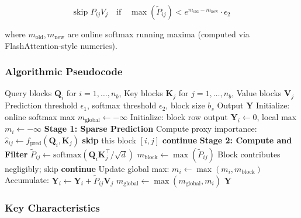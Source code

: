 \documentclass[11pt,a4paper]{article}
\begin{document}
\[
\text{skip } P_{ij} V_j \quad \text{if} \quad \max(\tilde{P}_{ij}) < e^{m_{\text{old}} - m_{\text{new}}} \cdot \epsilon_2
\]

where $m_{\text{old}}, m_{\text{new}}$ are online softmax running maxima (computed via FlashAttention-style numerics).

\subsubsection{Algorithmic Pseudocode}

\begin{algorithm}[H]
\caption{SpargeAttn: Two-Stage Block-Sparse Filtering}
\begin{algorithmic}[1]
\Require Query blocks $\mathbf{Q}_i$ for $i = 1, \ldots, n_b$, Key blocks $\mathbf{K}_j$ for $j = 1, \ldots, n_b$, Value blocks $\mathbf{V}_j$
\Require Prediction threshold $\epsilon_1$, softmax threshold $\epsilon_2$, block size $b_s$
\Ensure Output $\mathbf{Y}$
\State Initialize: online softmax max $m_{\text{global}} \gets -\infty$
    \State Initialize: block row output $\mathbf{Y}_i \gets 0$, local max $m_i \gets -\infty$
        \State \textbf{Stage 1: Sparse Prediction}
        \State Compute proxy importance: $\hat{s}_{ij} \gets f_{\text{pred}}(\mathbf{Q}_i, \mathbf{K}_j)$
            \State \textbf{skip} this block $[i,j]$  
            \State \textbf{continue} 
        \EndIf
        \State \textbf{Stage 2: Compute and Filter}
        \State $\tilde{P}_{ij} \gets \text{softmax}(\mathbf{Q}_i \mathbf{K}_j^\top / \sqrt{d})$
        \State $m_{\text{block}} \gets \max(\tilde{P}_{ij})$
            \State Block contributes negligibly; skip  
            \State \textbf{continue}
        \EndIf
        \State Update global max: $m_i \gets \max(m_i, m_{\text{block}})$
        \State Accumulate: $\mathbf{Y}_i \gets \mathbf{Y}_i + \tilde{P}_{ij} \mathbf{V}_j$
    \EndFor
    \State $m_{\text{global}} \gets \max(m_{\text{global}}, m_i)$
\EndFor
\Return $\mathbf{Y}$
\end{algorithmic}
\end{algorithm}

\subsubsection{Key Characteristics}
\end{document}
